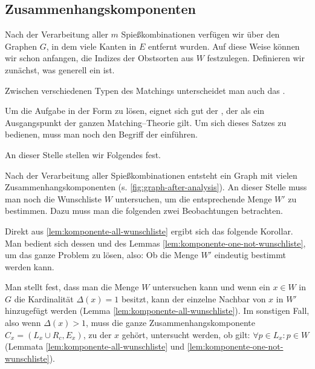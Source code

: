 \subsection{Zusammenhangskomponenten}
Nach der Verarbeitung aller $m$ Spießkombinationen verfügen wir über den Graphen $G$,
in dem viele Kanten in $E$ entfernt wurden.
Auf diese Weise können wir schon anfangen, die Indizes der Obstsorten aus $W$ festzulegen.
Definieren wir zunächst, was generell ein  ist.



Zwischen verschiedenen Typen des Matchings unterscheidet man auch das .



Um die Aufgabe in der Form zu lösen, eignet sich gut der ,
der als ein Ausgangspunkt der ganzen Matching--Theorie gilt. 
Um sich dieses Satzes zu bedienen, muss man noch den Begriff der  einführen.





An dieser Stelle stellen wir Folgendes fest.







Nach der Verarbeitung aller Spießkombinationen entsteht ein Graph mit vielen Zusammenhangskomponenten
(s. \cref{fig:graph-after-analysis}).
An dieser Stelle muss man noch die Wunschliste $W$ untersuchen, um die entsprechende Menge $W'$ zu bestimmen.
Dazu muss man die folgenden zwei Beobachtungen betrachten.





Direkt aus \cref{lem:komponente-all-wunschliste} ergibt sich das folgende Korollar.
Man bedient sich dessen und des Lemmas \ref{lem:komponente-one-not-wunschliste}, um das ganze Problem zu lösen, also: Ob die Menge $W'$ eindeutig bestimmt werden kann.



Man stellt fest, dass man die Menge $W$ untersuchen kann und wenn ein $x \in W$ in $G$ die
Kardinalität $\Delta(x) = 1$ besitzt, kann der einzelne Nachbar von $x$ in $W'$ hinzugefügt werden
(Lemma \ref{lem:komponente-all-wunschliste}).
Im sonstigen Fall, also wenn $\Delta(x) > 1$, muss die ganze Zusammenhangskomponente
$C_x = (L_x \cup R_c, E_x)$, zu der $x$ gehört, untersucht werden, ob gilt: $\forall p \in L_x: p \in W$
(Lemmata \ref{lem:komponente-all-wunschliste} und \ref{lem:komponente-one-not-wunschliste}).

